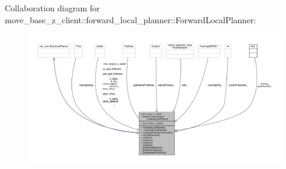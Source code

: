 Collaboration diagram for move\+\_\+base\+\_\+z\+\_\+client\+:\+:forward\+\_\+local\+\_\+planner\+:\+:Forward\+Local\+Planner\+:\nopagebreak
\begin{figure}[H]
\begin{center}
\leavevmode
\includegraphics[width=350pt]{classmove__base__z__client_1_1forward__local__planner_1_1ForwardLocalPlanner__coll__graph}
\end{center}
\end{figure}
